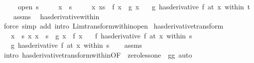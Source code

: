 \begin{isabellebody}
\ \ \ \ \ {\isachardoublequoteopen}open\ s{\isachardoublequoteclose}\isanewline
\ \ \ \ \ {\isachardoublequoteopen}x\ {\isasymin}\ s{\isachardoublequoteclose}\isanewline
\ \ \ \ \ {\isachardoublequoteopen}{\isasymAnd}x{\isachardot}{\kern0pt}\ x{\isasymin}s\ {\isasymLongrightarrow}\ f\ x\ {\isacharequal}{\kern0pt}\ g\ x{\isachardoublequoteclose}\isanewline
\ \ \ {\isachardoublequoteopen}{\isacharparenleft}{\kern0pt}g\ has{\isacharunderscore}{\kern0pt}derivative\ f{\isacharprime}{\kern0pt}{\isacharparenright}{\kern0pt}\ {\isacharparenleft}{\kern0pt}at\ x\ within\ t{\isacharparenright}{\kern0pt}{\isachardoublequoteclose}\isanewline
%
\isadelimproof
\ \ %
\endisadelimproof
%
\isatagproof
{}\isamarkupfalse%
\ assms\ \isamarkupfalse%
\ has{\isacharunderscore}{\kern0pt}derivative{\isacharunderscore}{\kern0pt}within\isanewline
\ \ \isamarkupfalse%
\ {\isacharparenleft}{\kern0pt}force\ simp\ add{\isacharcolon}{\kern0pt}\ intro{\isacharcolon}{\kern0pt}\ Lim{\isacharunderscore}{\kern0pt}transform{\isacharunderscore}{\kern0pt}within{\isacharunderscore}{\kern0pt}open{\isacharparenright}{\kern0pt}%
\endisatagproof
{\isafoldproof}%
%
\isadelimproof
\isanewline
%
\endisadelimproof
\isanewline
{}\isamarkupfalse%
\ has{\isacharunderscore}{\kern0pt}derivative{\isacharunderscore}{\kern0pt}transform{\isacharcolon}{\kern0pt}\isanewline
\ \ \ {\isachardoublequoteopen}x\ {\isasymin}\ s{\isachardoublequoteclose}\ {\isachardoublequoteopen}{\isasymAnd}x{\isachardot}{\kern0pt}\ x\ {\isasymin}\ s\ {\isasymLongrightarrow}\ g\ x\ {\isacharequal}{\kern0pt}\ f\ x{\isachardoublequoteclose}\isanewline
\ \ \ {\isachardoublequoteopen}{\isacharparenleft}{\kern0pt}f\ has{\isacharunderscore}{\kern0pt}derivative\ f{\isacharprime}{\kern0pt}{\isacharparenright}{\kern0pt}\ {\isacharparenleft}{\kern0pt}at\ x\ within\ s{\isacharparenright}{\kern0pt}{\isachardoublequoteclose}\isanewline
\ \ \ {\isachardoublequoteopen}{\isacharparenleft}{\kern0pt}g\ has{\isacharunderscore}{\kern0pt}derivative\ f{\isacharprime}{\kern0pt}{\isacharparenright}{\kern0pt}\ {\isacharparenleft}{\kern0pt}at\ x\ within\ s{\isacharparenright}{\kern0pt}{\isachardoublequoteclose}\isanewline
%
\isadelimproof
\ \ %
\endisadelimproof
%
\isatagproof
{}\isamarkupfalse%
\ assms\isanewline
\ \ \isamarkupfalse%
\ {\isacharparenleft}{\kern0pt}intro\ has{\isacharunderscore}{\kern0pt}derivative{\isacharunderscore}{\kern0pt}transform{\isacharunderscore}{\kern0pt}within{\isacharbrackleft}{\kern0pt}OF\ {\isacharunderscore}{\kern0pt}\ zero{\isacharunderscore}{\kern0pt}less{\isacharunderscore}{\kern0pt}one{\isacharcomma}{\kern0pt}\ \ g{\isacharequal}{\kern0pt}g{\isacharbrackright}{\kern0pt}{\isacharparenright}{\kern0pt}\ auto%

\end{isabellebody}
